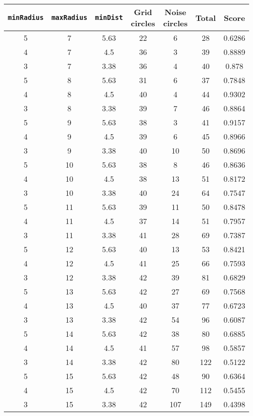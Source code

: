 \documentclass[letterpaper, 12pt]{article}
\begin{document}
\begin{longtable}{|c|c|c|c|c|c|c|}
\hline
\textbf{\texttt{minRadius}} & \textbf{\texttt{maxRadius}} & \textbf{\texttt{minDist}} & \textbf{Grid circles} & \textbf{Noise circles} & \textbf{Total} & \textbf{Score} \\
\hline
5 & 7 & 5.63 & 22 & 6 & 28 & 0.6286 \\
\hline
4 & 7 & 4.5 & 36 & 3 & 39 & 0.8889 \\
\hline
3 & 7 & 3.38 & 36 & 4 & 40 & 0.878 \\
\hline
5 & 8 & 5.63 & 31 & 6 & 37 & 0.7848 \\
\hline
4 & 8 & 4.5 & 40 & 4 & 44 & 0.9302 \\
\hline
3 & 8 & 3.38 & 39 & 7 & 46 & 0.8864 \\
\hline
5 & 9 & 5.63 & 38 & 3 & 41 & 0.9157 \\
\hline
4 & 9 & 4.5 & 39 & 6 & 45 & 0.8966 \\
\hline
3 & 9 & 3.38 & 40 & 10 & 50 & 0.8696 \\
\hline
5 & 10 & 5.63 & 38 & 8 & 46 & 0.8636 \\
\hline
4 & 10 & 4.5 & 38 & 13 & 51 & 0.8172 \\
\hline
3 & 10 & 3.38 & 40 & 24 & 64 & 0.7547 \\
\hline
5 & 11 & 5.63 & 39 & 11 & 50 & 0.8478 \\
\hline
4 & 11 & 4.5 & 37 & 14 & 51 & 0.7957 \\
\hline
3 & 11 & 3.38 & 41 & 28 & 69 & 0.7387 \\
\hline
5 & 12 & 5.63 & 40 & 13 & 53 & 0.8421 \\
\hline
4 & 12 & 4.5 & 41 & 25 & 66 & 0.7593 \\
\hline
3 & 12 & 3.38 & 42 & 39 & 81 & 0.6829 \\
\hline
5 & 13 & 5.63 & 42 & 27 & 69 & 0.7568 \\
\hline
4 & 13 & 4.5 & 40 & 37 & 77 & 0.6723 \\
\hline
3 & 13 & 3.38 & 42 & 54 & 96 & 0.6087 \\
\hline
5 & 14 & 5.63 & 42 & 38 & 80 & 0.6885 \\
\hline
4 & 14 & 4.5 & 41 & 57 & 98 & 0.5857 \\
\hline
3 & 14 & 3.38 & 42 & 80 & 122 & 0.5122 \\
\hline
5 & 15 & 5.63 & 42 & 48 & 90 & 0.6364 \\
\hline
4 & 15 & 4.5 & 42 & 70 & 112 & 0.5455 \\
\hline
3 & 15 & 3.38 & 42 & 107 & 149 & 0.4398 \\

\end{longtable}
\end{document}
